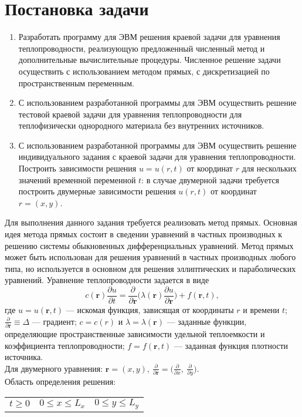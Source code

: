 \documentclass[12pt,a4paper]{article}
\begin{document}
	\section{Постановка задачи}
	\begin{enumerate}[itemindent=0.0em]
		\setlength{\itemsep}{1pt}%
		\item Разработать программу для ЭВМ решения краевой задачи для уравнения теплопроводности, реализующую предложенный численный метод и дополнительные вычислительные процедуры. Численное решение задачи осуществить с использованием методом прямых, с дискретизацией по пространственным переменным. 
		
		\item  С использованием разработанной программы для ЭВМ осуществить решение тестовой краевой задачи
		для уравнения теплопроводности для теплофизически однородного материала без внутренних источников.
		\item С использованием разработанной программы для ЭВМ осуществить решение индивидуального задания	с краевой задачи для уравнения теплопроводности. Построить зависимости решения $u = u(r, t)$ от координат
		$r$ для нескольких значений временной переменной $t$: в случае двумерной задачи требуется построить
		двумерные зависимости решения $u(r, t)$ от координат $r = (x, y)$. 
	\end{enumerate}
	
	Для выполнения данного задания требуется реализовать метод прямых. Основная идея метода прямых состоит в сведении уравнений в частных производных к решению системы обыкновенных дифференциальных уравнений. Метод прямых может быть использован для решения уравнений в частных производных любого типа, но используется в основном для решения эллиптических и параболических уравнений.
	Уравнение теплопроводности задается в виде
	\begin{equation}
		c(\textbf{r}) \displaystyle \frac{\partial u}{\partial t} = \displaystyle \frac{\partial}{\partial \textbf{r}} \biggl( \lambda(\textbf{r}) \displaystyle \frac{\partial u}{\partial \textbf{r}}\biggl) + f(\textbf{r}, t) ,
	\end{equation}
	где $u = u(\textbf{r}, t)$ — искомая функция, зависящая от координаты $r$ и времени $t$; $\displaystyle \frac{\partial }{\partial \textbf{r}} \equiv \Delta$ — градиент; $c = c(r)$
	и $\lambda = \lambda (\textbf{r})$ — заданные функции, определяющие пространственные зависимости удельной теплоемкости
	и коэффициента теплопроводности; $f = f(\textbf{r}, t)$ — заданная функция плотности источника.
	\\
	Для двумерного уравнения: $\textbf{r} = (x, y), \ \displaystyle  \frac{\partial }{\partial \textbf{r}} = \biggl(\frac{\partial }{\partial x},\  \frac{\partial }{\partial y} \biggl)$.\\
	Область определения решения:
	\begin{center}
		\begin{tabular}{c c c }
			$	t \geq 0 $&
			$	0 \leq x \leq L_x $&
			$	0 \leq y \leq L_y$
		\end{tabular}
	\end{center}
	
\end{document}

